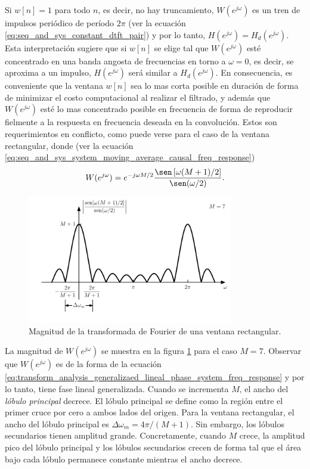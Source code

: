 \documentclass[a4paper]{report}
\begin{document}
Si \(w[n]=1\) para todo \(n\), es decir, no hay truncamiento, \(W(e^{j\omega})\) es un tren de impulsos periódico de período \(2\pi\) (ver la ecuación \ref{eq:seq_and_sys_constant_dtft_pair}) y por lo tanto, \(H(e^{j\omega})=H_d(e^{j\omega})\). Esta interpretación sugiere que si \(w[n]\) se elige tal que \(W(e^{j\omega})\) esté concentrado en una banda angosta de frecuencias en torno a \(\omega=0\), es decir, se aproxima a un impulso, \(H(e^{j\omega})\) será similar a \(H_d(e^{j\omega})\). En consecuencia, es conveniente que la ventana \(w[n]\) sea lo mas corta posible en duración de forma de minimizar el costo computacional al realizar el filtrado, y además que \(W(e^{j\omega})\) esté lo mas concentrado posible en frecuencia de forma de reproducir fielmente a la respuesta en frecuencia deseada en la convolución. Estos son requerimientos en conflicto, como puede verse para el caso de la ventana rectangular, donde (ver la ecuación \ref{eq:seq_and_sys_system_moving_average_causal_freq_response})
\begin{equation}\label{eq:filter_design_windowing_spectrum_rectangular}
 W(e^{j\omega})=e^{-j\omega M/2}\frac{\sen\left[\omega(M+1)/2\right]}{\sen(\omega/2)}. 
\end{equation}
\begin{figure}[!htb]
 \begin{center}
 \includegraphics[width=0.8\textwidth]{figuras/filter_design_windowing_magnitude_spectrum_rectangular.pdf}
 \caption{\label{fig:filter_design_windowing_magnitude_spectrum_rectangular} Magnitud de la  transformada de Fourier de una ventana rectangular.}
 \end{center}
\end{figure}
La magnitud de \(W(e^{j\omega})\) se muestra en la figura \ref{fig:filter_design_windowing_magnitude_spectrum_rectangular} para el caso \(M=7\). Observar que \(W(e^{j\omega})\)  es de la forma de la ecuación \ref{eq:transform_analysis_generalizaed_lineal_phase_system_freq_response} y por lo tanto, tiene fase lineal generalizada. Cuando se incrementa \(M\), el ancho del \emph{lóbulo principal} decrece. El lóbulo principal se define como la región entre el primer cruce por cero a ambos lados del origen. Para la ventana rectangular, el ancho del lóbulo principal es \(\Delta\omega_m=4\pi/(M+1)\). Sin embargo, los lóbulos secundarios tienen amplitud grande. Concretamente, cuando \(M\) crece, la amplitud pico del lóbulo principal y los lóbulos secundarios crecen de forma tal que el área bajo cada lóbulo permanece constante mientras el ancho decrece.
\end{document}

